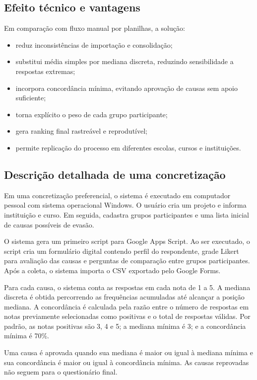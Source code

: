 \subsection{Efeito técnico e vantagens}

Em comparação com fluxo manual por planilhas, a solução:

\begin{itemize}
  \item reduz inconsistências de importação e consolidação;
  \item substitui média simples por mediana discreta, reduzindo sensibilidade a respostas extremas;
  \item incorpora concordância mínima, evitando aprovação de causas sem apoio suficiente;
  \item torna explícito o peso de cada grupo participante;
  \item gera ranking final rastreável e reprodutível;
  \item permite replicação do processo em diferentes escolas, cursos e instituições.
\end{itemize}

\subsection{Descrição detalhada de uma concretização}

Em uma concretização preferencial, o sistema é executado em computador pessoal com sistema operacional Windows. O usuário cria um projeto e informa instituição e curso. Em seguida, cadastra grupos participantes e uma lista inicial de causas possíveis de evasão.

O sistema gera um primeiro script para Google Apps Script. Ao ser executado, o script cria um formulário digital contendo perfil do respondente, grade Likert para avaliação das causas e perguntas de comparação entre grupos participantes. Após a coleta, o sistema importa o CSV exportado pelo Google Forms.

Para cada causa, o sistema conta as respostas em cada nota de 1 a 5. A mediana discreta é obtida percorrendo as frequências acumuladas até alcançar a posição mediana. A concordância é calculada pela razão entre o número de respostas em notas previamente selecionadas como positivas e o total de respostas válidas. Por padrão, as notas positivas são 3, 4 e 5; a mediana mínima é 3; e a concordância mínima é 70\%.

Uma causa é aprovada quando sua mediana é maior ou igual à mediana mínima e sua concordância é maior ou igual à concordância mínima. As causas reprovadas não seguem para o questionário final.

